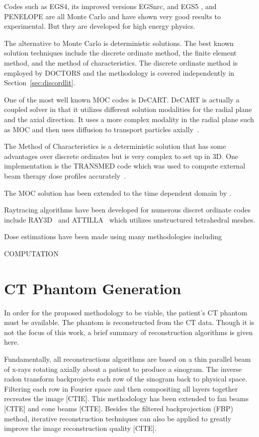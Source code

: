 Codes such as EGS4, its improved versions EGSnrc, and EGS5 \citep{ref:nelsonw}, and PENELOPE \citep{ref:salvatf} are all Monte Carlo and have shown very good results to experimental. But they are developed for high energy physics.

The alternative to Monte Carlo is deterministic solutions. The best known solution techniques include the discrete ordinate method, the finite element method, and the method of characteristics. The discrete ordinate method is employed by DOCTORS and the methodology is covered independently in Section~\ref{sec:discordlit}.

One of the most well known MOC codes is DeCART. DeCART is actually a coupled solver in that it utilizes different solution modalities for the radial plane and the axial direction. It uses a more complex modality in the radial plane such as MOC and then uses diffusion to transport particles axially~\citep{ref:hursinm}.

The Method of Characteristics is a deterministic solution that has some advantages over discrete ordinates but is very complex to set up in 3D. One implementation is the TRANSMED code which was used to compute external beam therapy dose profiles accurately~\citep{ref:williamsm}.

The MOC solution has been extended to the time dependent domain by \citet{ref:hoffmana}.

Raytracing algorithms have been developed for numerous discret ordinate codes include RAY3D~\citep{ref:yingz} and ATTILLA~\citep{ref:wareingt} which utilizes unstructured tetrahedral meshes.



Dose estimations have been made using many methodologies including 

COMPUTATION

\section{CT Phantom Generation}

In order for the proposed methodology to be viable, the patient's CT phantom must be available. The phantom is reconstructed from the CT data. Though it is not the focus of this work, a brief summary of reconstruction algorithms is given here.

Fundamentally, all reconstructions algorithms are based on a thin parallel beam of x-rays rotating axially about a patient to produce a sinogram. The inverse radon transform backprojects each row of the sinogram back to physical space. Filtering each row in Fourier space and then compositing all layers together recreates the image [CTIE]. This methodology has been extended to fan beams [CITE] and cone beams [CITE]. Besides the filtered backprojection (FBP) method, iterative reconstruction techniques can also be applied to greatly improve the image reconstruction quality [CITE].

